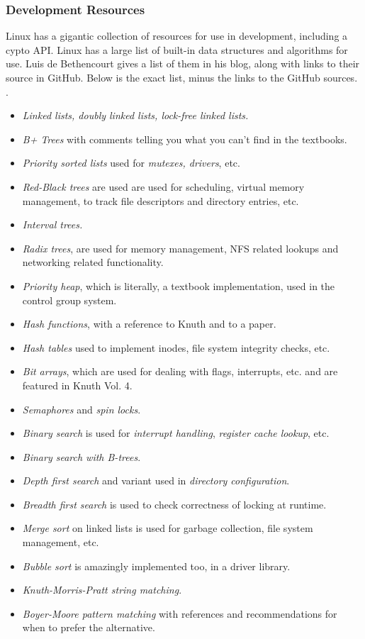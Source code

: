\documentclass[onecolumn,draftclsnofoot, 10pt, compsoc]{IEEEtran}
\begin{document}
		\subsubsection{Development Resources}
			Linux has a gigantic collection of resources for use in development, including a cypto API.
			Linux has a large list of built-in data structures and algorithms for use.
			Luis de Bethencourt gives a list of them in his blog, along with links to their source in GitHub.
			Below is the exact list, minus the links to the GitHub sources. \cite{linuxRes}.
			\begin{itemize}
				\item \textit{Linked lists, doubly linked lists, lock-free linked lists.}
				\item \textit{B+ Trees} with comments telling you what you can't find in the textbooks.
				\item \textit{Priority sorted lists} used for \textit{mutexes, drivers}, etc.
				\item \textit{Red-Black trees} are used are used for scheduling, virtual memory management, to track file descriptors and directory entries, etc.
				\item \textit{Interval trees.}
				\item \textit{Radix trees}, are used for memory management, NFS related lookups and networking related functionality.
				\item \textit{Priority heap}, which is literally, a textbook implementation, used in the control group system.
				\item \textit{Hash functions}, with a reference to Knuth and to a paper.
				\item \textit{Hash tables} used to implement inodes, file system integrity checks, etc.
				\item \textit{Bit arrays}, which are used for dealing with flags, interrupts, etc. and are featured in Knuth Vol. 4.
				\item\textit{ Semaphores} and \textit{spin locks}.
				\item \textit{Binary search} is used for\textit{ interrupt handling}, \textit{register cache lookup}, etc.
				\item \textit{Binary search with B-trees}.
				\item \textit{Depth first search} and variant used in \textit{directory configuration}.
				\item \textit{Breadth first search} is used to check correctness of locking at runtime.
				\item\textit{ Merge sort} on linked lists is used for garbage collection, file system management, etc.
				\item \textit{Bubble sort} is amazingly implemented too, in a driver library.
				\item \textit{Knuth-Morris-Pratt string matching}.
				\item \textit{Boyer-Moore pattern matching} with references and recommendations for when to prefer the alternative.
			\end{itemize}
	
\end{document}
